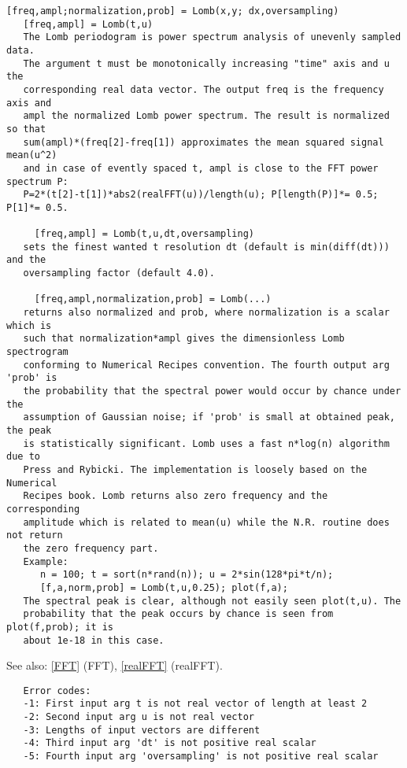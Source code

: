 \documentclass[a4paper]{article}
\begin{document}
\begin{tscreen}
\begin{verbatim}
[freq,ampl;normalization,prob] = Lomb(x,y; dx,oversampling)
   [freq,ampl] = Lomb(t,u)
   The Lomb periodogram is power spectrum analysis of unevenly sampled data.
   The argument t must be monotonically increasing "time" axis and u the
   corresponding real data vector. The output freq is the frequency axis and
   ampl the normalized Lomb power spectrum. The result is normalized so that
   sum(ampl)*(freq[2]-freq[1]) approximates the mean squared signal mean(u^2)
   and in case of evently spaced t, ampl is close to the FFT power spectrum P:
   P=2*(t[2]-t[1])*abs2(realFFT(u))/length(u); P[length(P)]*= 0.5; P[1]*= 0.5.

     [freq,ampl] = Lomb(t,u,dt,oversampling)
   sets the finest wanted t resolution dt (default is min(diff(dt))) and the
   oversampling factor (default 4.0).

     [freq,ampl,normalization,prob] = Lomb(...)
   returns also normalized and prob, where normalization is a scalar which is
   such that normalization*ampl gives the dimensionless Lomb spectrogram
   conforming to Numerical Recipes convention. The fourth output arg 'prob' is
   the probability that the spectral power would occur by chance under the
   assumption of Gaussian noise; if 'prob' is small at obtained peak, the peak
   is statistically significant. Lomb uses a fast n*log(n) algorithm due to
   Press and Rybicki. The implementation is loosely based on the Numerical
   Recipes book. Lomb returns also zero frequency and the corresponding
   amplitude which is related to mean(u) while the N.R. routine does not return
   the zero frequency part.
   Example:
      n = 100; t = sort(n*rand(n)); u = 2*sin(128*pi*t/n);
      [f,a,norm,prob] = Lomb(t,u,0.25); plot(f,a);
   The spectral peak is clear, although not easily seen plot(t,u). The
   probability that the peak occurs by chance is seen from plot(f,prob); it is
   about 1e-18 in this case.
\end{verbatim}

See also: \ref{FFT} {(FFT)}, \ref{realFFT} {(realFFT)}.
\begin{verbatim}
   Error codes:
   -1: First input arg t is not real vector of length at least 2
   -2: Second input arg u is not real vector
   -3: Lengths of input vectors are different
   -4: Third input arg 'dt' is not positive real scalar
   -5: Fourth input arg 'oversampling' is not positive real scalar
\end{verbatim}
\end{tscreen}
\end{document}
